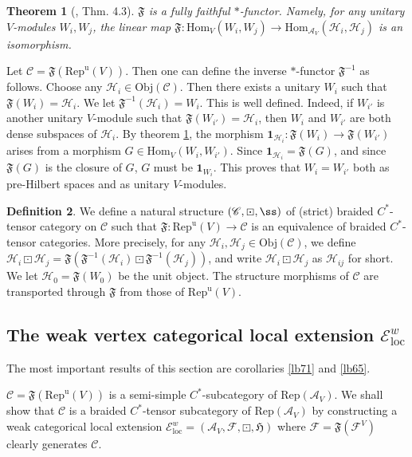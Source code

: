 \documentclass[12pt,a4paper]{article}
\theoremstyle{definition}
\newtheorem{df}{Definition}[subsection]
\theoremstyle{plain}
\newtheorem{thm}[df]{Theorem}
\newcommand{\fk}{\mathfrak}
\newcommand{\mc}{\mathcal}
\newcommand{\id}{\mathbf{1}}
\newcommand{\Hom}{\mathrm{Hom}}
\newcommand{\Rep}{\mathrm{Rep}}
\newcommand{\loc}{\mathrm{loc}}
\newcommand{\scr}{\mathscr}
\newcommand{\RepuV}{\mathrm{Rep}^{\mathrm u}(V)}
\newcommand{\Obj}{\mathrm{Obj}}
\numberwithin{equation}{subsection}
\begin{document}
\begin{thm}[\cite{CWX}, \cite{Gui19b} Thm. 4.3]\label{lb54}
$\fk F$ is a fully faithful $*$-functor. Namely, for any unitary $V$-modules $W_i,W_j$, the linear map $\fk F:\Hom_V(W_i,W_j)\rightarrow\Hom_{\mc A_V}(\mc H_i,\mc H_j)$ is an isomorphism.
\end{thm}

Let $\scr C=\fk F(\RepuV)$. Then one can define the inverse $*$-functor $\fk F^{-1}$ as follows. Choose any $\mc H_i\in\Obj(\scr C)$. Then there exists a unitary $W_i$ such that $\fk F(W_i)=\mc H_i$. We let $\fk F^{-1}(\mc H_i)=W_i$. This is well defined. Indeed, if $W_{i'}$ is another unitary $V$-module such that $\fk F(W_{i'})=\mc H_i$, then $W_i$ and $W_{i'}$ are both dense subspaces of $\mc H_i$. By theorem \ref{lb54}, the morphism $\id_{\mc H_i}:\fk F(W_i)\rightarrow\fk F(W_{i'})$ arises from a morphism $G\in\Hom_V(W_i,W_{i'})$. Since $\id_{\mc H_i}=\fk F (G)$, and since $\fk F(G)$ is the closure of $G$, $G$ must be $\id_{W_i}$. This proves that $W_i=W_{i'}$ both as pre-Hilbert spaces and as unitary $V$-modules.


\begin{df}
We define a natural structure $(\scr C,\boxdot,\ss)$ of (strict) braided $C^*$-tensor category on $\scr C$ such that $\fk F:\RepuV\rightarrow\scr C$ is an equivalence of braided $C^*$-tensor categories. More precisely, for any $\mc H_i,\mc H_j\in\Obj(\scr C)$, we define $\mc H_i\boxdot\mc H_j=\fk F(\fk F^{-1}(\mc H_i)\boxdot\fk F^{-1}(\mc H_j))$, and write $\mc H_i\boxdot\mc H_j$ as $\mc H_{ij}$ for short. We let $\mc H_0=\fk F(W_0)$ be the unit object. The structure morphisms of $\scr C$ are transported through $\fk F$ from those of $\RepuV$.
\end{df}


\subsection{The weak vertex categorical local extension $\scr E^w_\loc$}\label{lb68}


The most important results of this section are corollaries \ref{lb71} and \ref{lb65}.




$\scr C=\fk F(\RepuV)$ is a semi-simple $C^*$-subcategory of $\Rep(\mc A_V)$. We shall show that $\scr C$ is a braided $C^*$-tensor subcategory of $\Rep(\mc A_V)$ by constructing a weak categorical local extension $\scr E^w_\loc=(\mc A_V,\mc F,\boxdot,\fk H)$ where $\mc F=\fk F(\mc F^V)$ clearly generates $\scr C$.
\end{document}
